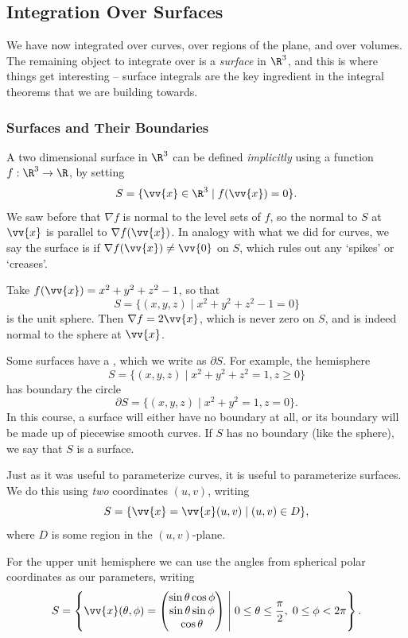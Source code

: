 \subsection{Integration Over Surfaces}

We have now integrated over curves, over regions of the plane, and over volumes. The remaining object to integrate over is a \emph{surface} in $\R^3$, and this is where things get interesting -- surface integrals are the key ingredient in the integral theorems that we are building towards.

\subsubsection{Surfaces and Their Boundaries}

A two dimensional surface in $\R^3$ can be defined \emph{implicitly} using a function $f : \R^3 \rightarrow \R$, by setting
$$
S = \{\vv{x} \in \R^3 \mid f(\vv{x}) = 0\}.
$$
We saw before that $\nabla f$ is normal to the level sets of $f$, so the normal to $S$ at $\vv{x}$ is parallel to $\nabla f(\vv{x})$. In analogy with what we did for curves, we say the surface is  if $\nabla f(\vv{x}) \neq \vv{0}$ on $S$, which rules out any `spikes' or `creases'.

\begin{example}
	Take $f(\vv{x}) = x^2 + y^2 + z^2 - 1$, so that
	$$
	S = \{(x, y, z) \mid x^2 + y^2 + z^2 - 1 = 0\}
	$$
	is the unit sphere. Then $\nabla f = 2 \vv{x}$, which is never zero on $S$, and is indeed normal to the sphere at $\vv{x}$.
\end{example}

Some surfaces have a , which we write as $\partial S$. For example, the hemisphere
$$
S = \{(x, y, z) \mid x^2 + y^2 + z^2 = 1, z \geq 0\}
$$
has boundary the circle
$$
\partial S = \{(x, y, z) \mid x^2 + y^2 = 1, z = 0\}.
$$
In this course, a surface will either have no boundary at all, or its boundary will be made up of piecewise smooth curves. If $S$ has no boundary (like the sphere), we say that $S$ is a  surface.

Just as it was useful to parameterize curves, it is useful to parameterize surfaces. We do this using \emph{two} coordinates $(u, v)$, writing
$$
S = \{\vv{x} = \vv{x}(u, v) \mid (u, v) \in D\},
$$
where $D$ is some region in the $(u, v)$-plane.

\begin{example}
	For the upper unit hemisphere we can use the angles from spherical polar coordinates as our parameters, writing
	$$
	S = \left\{\vv{x}(\theta, \phi) = \begin{pmatrix}
		\sin \theta \cos \phi \\
		\sin \theta \sin \phi \\
		\cos \theta
	\end{pmatrix} \;\middle|\; 0 \leq \theta \leq \frac{\pi}{2}, \; 0 \leq \phi < 2 \pi\right\}.
	$$
\end{example}

